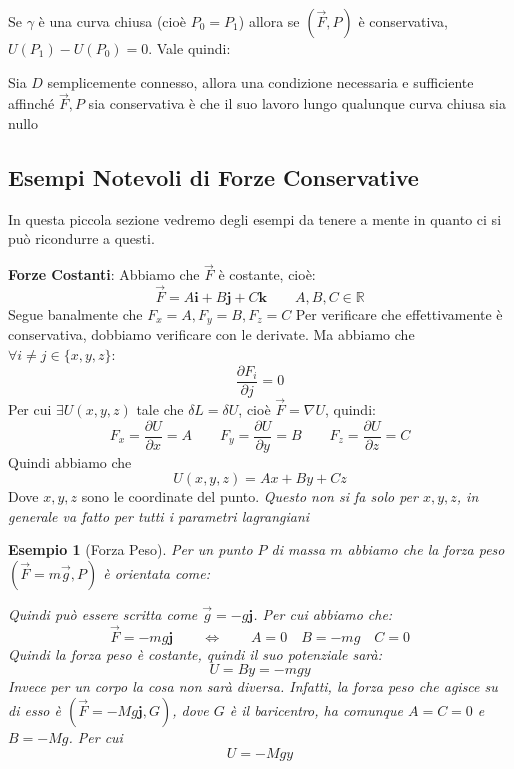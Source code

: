 \documentclass[11pt,a4paper,twoside]{article}
\newtheorem{es}{Esempio}
\theoremstyle{definition}
\begin{document}
Se $\gamma$ è una curva chiusa (cioè $P_0 = P_1$) allora se $(\vec F, P)$ è conservativa, $U(P_1) - U(P_0) = 0$. Vale quindi:

\begin{prop}{}{}
	Sia $D$ semplicemente connesso, allora una condizione necessaria e sufficiente affinché $\vec F, P$ sia conservativa è che il suo lavoro lungo qualunque curva chiusa sia nullo
\end{prop}

\subsection{Esempi Notevoli di Forze Conservative}

In questa piccola sezione vedremo degli esempi da tenere a mente in quanto ci si può ricondurre a questi.

\textbf{Forze Costanti}: Abbiamo che $\vec F$ è costante, cioè:
\[ \vec F = A \mathbf i + B \mathbf j + C \mathbf k \qquad A, B, C \in \mathbb R\]
Segue banalmente che $F_x = A, F_y = B, F_z = C$ Per verificare che effettivamente è conservativa, dobbiamo verificare con le derivate. Ma abbiamo che $\forall i\neq j \in \{x,y,z\}$:
\[\frac{\partial F_i}{\partial j} = 0\]
Per cui $\exists U(x,y,z)$ tale che $\delta L = \delta U$, cioè $\vec F = \nabla U$, quindi:
\[ F_x = \frac{\partial U}{\partial x} = A\qquad F_y = \frac{\partial U}{\partial y}= B \qquad F_z = \frac{\partial U}{\partial z} = C \]
Quindi abbiamo che \[U(x,y,z) = Ax + By + Cz\]
Dove $x,y,z$ sono le coordinate del punto. \textit{Questo non si fa solo per $x,y,z$, in generale va fatto per tutti i parametri lagrangiani}

\begin{es}[Forza Peso]
	Per un punto $P$ di massa $m$ abbiamo che la forza peso $(\vec F = m\vec g, P)$ è orientata come:
	\begin{center}
	\end{center}
	Quindi può essere scritta come $\vec g = - g \mathbf j$. Per cui abbiamo che:
	\[ \vec F = -mg \mathbf j\qquad \Leftrightarrow \qquad A = 0\quad B = -mg \quad C = 0 \]
	Quindi la forza peso è costante, quindi il suo potenziale sarà:
	\[ U = By = -mgy \]
	Invece per un corpo la cosa non sarà diversa. Infatti, la forza peso che agisce su di esso è $(\vec F = -Mg\mathbf j, G)$, dove $G$ è il baricentro, ha comunque $A=C=0$ e $B = -Mg$. Per cui
	\[ U = -Mgy \]
\end{es}
\end{document}
